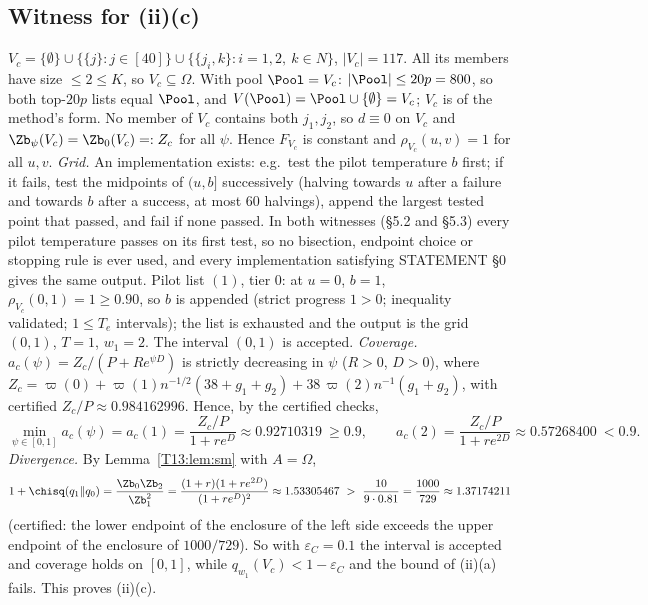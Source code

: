 \documentclass[11pt]{report}
\begin{document}
\subsection{Witness for (ii)(c)}
$V_c=\{\emptyset\}\cup\{\{j\}:j\in[40]\}\cup\{\{j_i,k\}:i=1,2,\ k\in N\}$, $|V_c|=117$. All its members have size $\le2\le K$, so $V_c\subseteq\Omega$. With pool $\Pool=V_c$: $|\Pool|\le 20p=800$, so both top-$20p$ lists equal $\Pool$, and $V(\Pool)=\Pool\cup\{\emptyset\}=V_c$; $V_c$ is of the method's form.
No member of $V_c$ contains both $j_1,j_2$, so $d\equiv0$ on $V_c$ and $\Zb_\psi(V_c)=\Zb_0(V_c)=:Z_c$ for all $\psi$. Hence $F_{V_c}$ is constant and $\rho_{V_c}(u,v)=1$ for all $u,v$.
\emph{Grid.} An implementation exists: e.g.\ test the pilot temperature $b$ first; if it fails, test the midpoints of $(u,b]$ successively (halving towards $u$ after a failure and towards $b$ after a success, at most 60 halvings), append the largest tested point that passed, and fail if none passed. In both witnesses (\S5.2 and \S5.3) every pilot temperature passes on its first test, so no bisection, endpoint choice or stopping rule is ever used, and every implementation satisfying STATEMENT \S0 gives the same output. Pilot list $(1)$, tier $0$: at $u=0$, $b=1$, $\rho_{V_c}(0,1)=1\ge0.90$, so $b$ is appended (strict progress $1>0$; inequality validated; $1\le T_e$ intervals); the list is exhausted and the output is the grid $(0,1)$, $T=1$, $w_1=2$. The interval $(0,1)$ is accepted.
\emph{Coverage.} $a_c(\psi)=Z_c/(P+Re^{\psi D})$ is strictly decreasing in $\psi$ ($R>0$, $D>0$), where
$Z_c=\varpi(0)+\varpi(1)n^{-1/2}(38+g_1+g_2)+38\,\varpi(2)n^{-1}(g_1+g_2)$, with certified $Z_c/P\approx0.984162996$. Hence, by the certified checks,
\[
\min_{\psi\in[0,1]}a_c(\psi)=a_c(1)=\frac{Z_c/P}{1+re^{D}}\approx0.92710319\ \ge0.9,\qquad
a_c(2)=\frac{Z_c/P}{1+re^{2D}}\approx0.57268400\ <0.9 .
\]
\emph{Divergence.} By Lemma~\ref{T13:lem:sm} with $A=\Omega$,
\[
1+\chisq(q_1\|q_0)=\frac{\Zb_0\Zb_2}{\Zb_1^2}=\frac{(1+r)(1+re^{2D})}{(1+re^D)^2}\approx1.53305467\ >\ \frac{10}{9\cdot0.81}=\frac{1000}{729}\approx1.37174211
\]
(certified: the lower endpoint of the enclosure of the left side exceeds the upper endpoint of the enclosure of $1000/729$).
So with $\varepsilon_C=0.1$ the interval is accepted and coverage holds on $[0,1]$, while $q_{w_1}(V_c)<1-\varepsilon_C$ and the bound of (ii)(a) fails. This proves (ii)(c).
\end{document}
